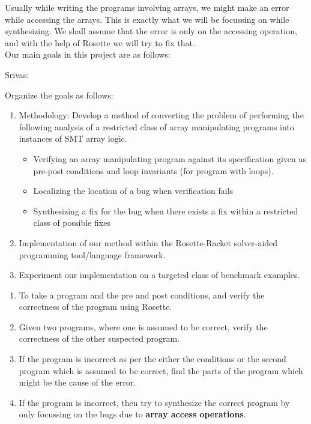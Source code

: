 \documentclass[a4paper, 12pt, notitlepage] {article}
\newcommand{\mscmt}[1]{{\color{blue} \tiny{Srivas: {#1}}}}
\begin{document}
Usually while writing the programs involving arrays, we might make an error while accessing the arrays. This is exactly what we will be focussing on while synthesizing. We shall assume that the error is only on the accessing operation, and with the help of Rosette we will try to fix that.\\

Our main goals in this project are as follows: \\
\mscmt{Organize the goals as follows:
\begin{enumerate}
\item Methodology: Develop a method of converting the problem of performing the following analysis of a restricted class of array manipulating programs into instances of SMT array logic.
\begin{itemize}
\item Verifying an array manipulating program against its specification given as pre-post conditions and loop invariants (for program with loops).
\item Localizing the location of a bug when verification fails
\item Synthesizing a fix for the bug when there exists a fix within a restricted class of possible fixes
\end{itemize}

\item Implementation of our method within the Rosette-Racket solver-aided programming tool/language framework.\

\item Experiment our implementation on a targeted class of benchmark examples.
\end{enumerate}
}
\begin{enumerate}
	\item To take a program and the pre and post conditions, and verify the correctness of the program using Rosette.
	\item Given two programs, where one is assumed to be correct, verify the correctness of the other suspected program.
	\item If the program is incorrect as per the either the conditions or the second program which is assumed to be correct, find the parts of the program which might be the cause of the error.
	\item If the program is incorrect, then  try to synthesize the correct program by only focussing on the bugs due to {\bf array access operations}.
\end{enumerate}
\end{document}
